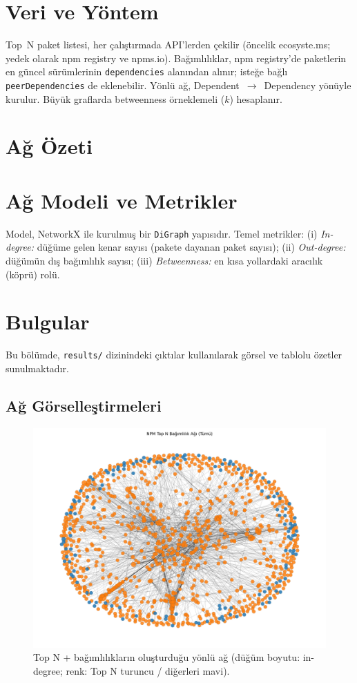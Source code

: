 \documentclass[11pt,a4paper]{article}
\begin{document}
\section{Veri ve Yöntem}
Top~N paket listesi, her çalıştırmada API'lerden çekilir (öncelik ecosyste.ms; yedek olarak npm registry ve npms.io). Bağımlılıklar, npm registry'de paketlerin en güncel sürümlerinin \texttt{dependencies} alanından alınır; isteğe bağlı \texttt{peerDependencies} de eklenebilir. Yönlü ağ, Dependent~$\to$~Dependency yönüyle kurulur. Büyük graflarda betweenness örneklemeli ($k$) hesaplanır.

\section{Ağ Özeti}

\section{Ağ Modeli ve Metrikler}
Model, NetworkX ile kurulmuş bir \texttt{DiGraph} yapısıdır. Temel metrikler: (i) \emph{In-degree:} düğüme gelen kenar sayısı (pakete dayanan paket sayısı); (ii) \emph{Out-degree:} düğümün dış bağımlılık sayısı; (iii) \emph{Betweenness:} en kısa yollardaki aracılık (köprü) rolü.

\section{Bulgular}
Bu bölümde, \texttt{results/} dizinindeki çıktılar kullanılarak görsel ve tablolu özetler sunulmaktadır.

\subsection{Ağ Görselleştirmeleri}
\begin{figure}[h]
  \centering
  \includegraphics{network_full_topN.png}
  \caption{Top N + bağımlılıkların oluşturduğu yönlü ağ (düğüm boyutu: in-degree; renk: Top N turuncu / diğerleri mavi).}
\end{figure}
\end{document}
